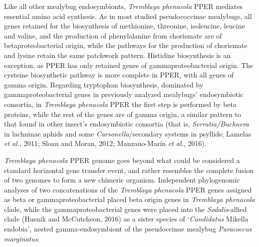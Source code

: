 \documentclass[11pt]{article}
\begin{document}
\begin{sloppypar}
\par

Like all other mealybug endosymbionts, \textit{Tremblaya phenacola} PPER mediates essential amino acid synthesis. 
As in most studied pseudococcinae mealybugs, all genes retained for the biosynthesis of methionine, threonine, isoleucine, leucine and valine, and the production of phenylalanine from chorismate are of betaproteobacterial origin, while the pathways for the production of chorismate and lysine retain the same patchwork pattern. 
Histidine biosynthesis is an exception, as PPER has only retained genes of gammaproteobacterial origin. 
The cysteine biosynthetic pathway is more complete in PPER, with all genes of gamma origin. 
Regarding tryptophan biosynthesis, dominated by gammaproteobacterial genes in previously analyzed mealybugs’ endosymbiotic consortia, in \textit{Tremblaya phenacola} PPER the first step is performed by beta proteins, while the rest of the genes are of gamma origin, a similar pattern to that found in other insect’s endosymbiotic consortia (that is, \textit{Serratia/Buchnera} in lachninae aphids and some \textit{Carsonella}/secondary systems in psyllids; Lamelas \textit{et al.}, 2011; Sloan and Moran, 2012; Manzano-Marín \textit{et al.}, 2016). 

\par

\textit{Tremblaya phenacola} PPER genome goes beyond what could be considered a standard horizontal gene transfer event, and rather resembles the complete fusion of two genomes to form a new chimeric organism. 
Independent phylogenomic analyses of two concatenations of the \textit{Tremblaya phenacola} PPER genes assigned as beta or gammaproteobacterial placed beta origin genes in \textit{Tremblaya phenacola} clade, while the gammaproteobacterial genes were placed into the \textit{Sodalis}-allied clade (Husnik and McCutcheon, 2016) as a sister species of ‘\textit{Candidatus} Mikella endobia’, nested gamma-endosymbiont of the pseudoccinae mealybug \textit{Paracoccus marginatus}. 

\par


\end{sloppypar}
\end{document}
